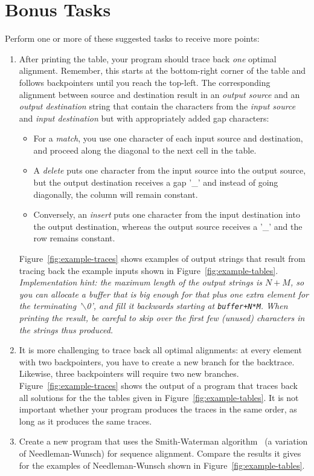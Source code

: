 \documentclass[a4paper,10pt]{article}
\begin{document}
\pagebreak
\section{Bonus Tasks}

Perform one or more of these suggested tasks to receive more points:

\begin{enumerate}
\item
  After printing the table, your program should trace back \emph{one} optimal alignment.
  Remember, this starts at the bottom-right corner of the table and follows backpointers until you reach the top-left.
  The corresponding alignment between source and destination result in an \emph{output source} and an \emph{output destination} string that contain the characters from the \emph{input source} and \emph{input destination} but with appropriately added gap characters:
  \begin{itemize}
  \item
    For a \emph{match}, you use one character of each input source and destination, and proceed along the diagonal to the next cell in the table.
  \item
    A \emph{delete} puts one character from the input source into the output source, but the output destination receives a gap '\_' and instead of going diagonally, the column will remain constant.
  \item
    Conversely, an \emph{insert} puts one character from the input destination into the output destination, whereas the output source receives a '\_' and the row remains constant.
  \end{itemize}
  Figure~\ref{fig:example-traces} shows examples of output strings that result from tracing back the example inputs shown in Figure~\ref{fig:example-tables}.\\
  \emph{
    Implementation hint:
    the maximum length of the output strings is $N+M$, so you can allocate a buffer that is big enough for that plus one extra element for the terminating '$\backslash$0', and fill it backwards starting at \texttt{buffer+N*M}.
    When printing the result, be careful to skip over the first few (unused) characters in the strings thus produced.
  }
\item
  It is more challenging to trace back all optimal alignments:
  at every element with two backpointers, you have to create a new branch for the backtrace.
  Likewise, three backpointers will require two new branches.
  Figure~\ref{fig:example-traces} shows the output of a program that traces back all solutions for the the tables given in Figure~\ref{fig:example-tables}.
  It is not important whether your program produces the traces in the same order, as long as it produces the same traces.
\item
  Create a new program that uses the Smith-Waterman algorithm~\cite{wikipedia:smith-waterman} (a variation of Needleman-Wunsch) for sequence alignment.
  Compare the results it gives for the examples of Needleman-Wunsch shown in Figure~\ref{fig:example-tables}.
\end{enumerate}
\end{document}

